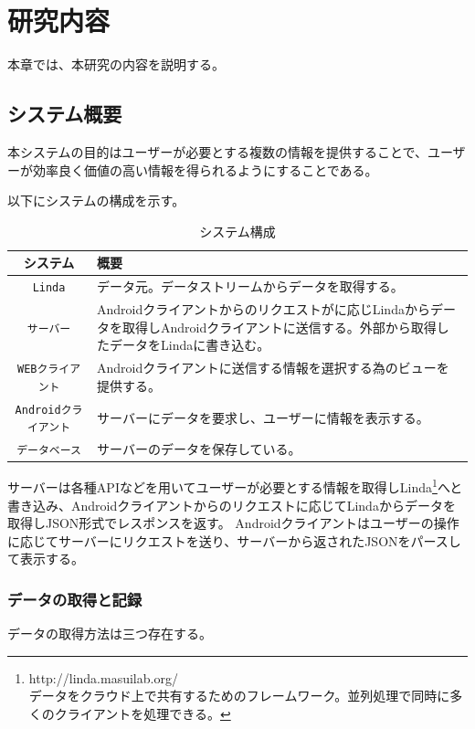 \chapter{研究内容}
\label{chap:contents}

本章では、本研究の内容を説明する。

\section{システム概要}

本システムの目的はユーザーが必要とする複数の情報を提供することで、ユーザーが効率良く価値の高い情報を得られるようにすることである。

以下にシステムの構成を示す。

\begin{table}[htbp]
  \caption{システム構成}
  \label{tb:files}
  \begin{center}\begin{tabular}{|c|p{12cm}|}
    \hline
    システム&概要\\\hline\hline
    {\tt Linda}&データ元。データストリームからデータを取得する。\\\hline
    {\tt サーバー}&Androidクライアントからのリクエストがに応じLindaからデータを取得しAndroidクライアントに送信する。外部から取得したデータをLindaに書き込む。\\\hline
    {\tt WEBクライアント}&Androidクライアントに送信する情報を選択する為のビューを提供する。\\\hline
    {\tt Androidクライアント}&サーバーにデータを要求し、ユーザーに情報を表示する。\\\hline
    {\tt データベース}&サーバーのデータを保存している。\\\hline
  \end{tabular}\end{center}
\end{table}

サーバーは各種APIなどを用いてユーザーが必要とする情報を取得しLinda\footnote{http://linda.masuilab.org/\\データをクラウド上で共有するためのフレームワーク。並列処理で同時に多くのクライアントを処理できる。}へと書き込み、Androidクライアントからのリクエストに応じてLindaからデータを取得しJSON形式でレスポンスを返す。
Androidクライアントはユーザーの操作に応じてサーバーにリクエストを送り、サーバーから返されたJSONをパースして表示する。

\subsection{データの取得と記録}
データの取得方法は三つ存在する。

